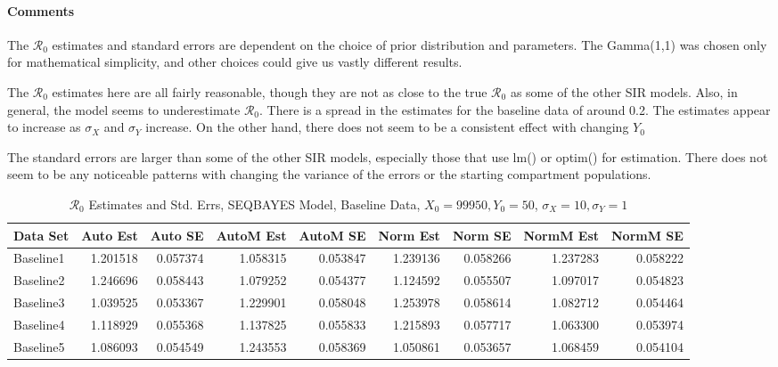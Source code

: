 \documentclass[12pt]{article}
\newcommand{\rr}{\ensuremath{\mathcal{R}_0}}
\begin{document}
\paragraph{Comments}

The $\rr$ estimates and standard errors are dependent on the choice of prior distribution and parameters. The Gamma(1,1) was chosen only for mathematical simplicity, and other choices could give us vastly different results. 

The $\rr$ estimates here are all fairly reasonable, though they are not as close to the true $\rr$ as some of the other SIR models. Also, in general, the model seems to underestimate $\rr$. There is a spread in the estimates for the baseline data of around 0.2. The estimates appear to increase as $\sigma_X$ and $\sigma_Y$ increase. On the other hand, there does not seem to be a consistent effect with changing $Y_0$

The standard errors are larger than some of the other SIR models, especially those that use lm() or optim() for estimation. There does not seem to be any noticeable patterns with changing the variance of the errors or the starting compartment populations.

\begin{table}[H]
	
	\caption{$\rr$ Estimates and Std. Errs, SEQBAYES Model, 
		Baseline Data, $X_0 = 99950, Y_0 = 50$, 
		$\sigma_X = 10, \sigma_Y = 1$}
	\begin{footnotesize}
		\hskip -1cm
		\begin{tabular}{l|r|r|r|r|r|r|r|r}
			\hline
			Data Set & Auto Est & Auto SE & AutoM Est & AutoM SE & Norm Est & Norm SE & NormM Est & NormM SE\\
			\hline
			Baseline1 & 1.201518 & 0.057374 & 1.058315 & 0.053847 & 1.239136 & 0.058266 & 1.237283 & 0.058222\\
			\hline
			Baseline2 & 1.246696 & 0.058443 & 1.079252 & 0.054377 & 1.124592 & 0.055507 & 1.097017 & 0.054823\\
			\hline
			Baseline3 & 1.039525 & 0.053367 & 1.229901 & 0.058048 & 1.253978 & 0.058614 & 1.082712 & 0.054464\\
			\hline
			Baseline4 & 1.118929 & 0.055368 & 1.137825 & 0.055833 & 1.215893 & 0.057717 & 1.063300 & 0.053974\\
			\hline
			Baseline5 & 1.086093 & 0.054549 & 1.243553 & 0.058369 & 1.050861 & 0.053657 & 1.068459 & 0.054104\\
			\hline
		\end{tabular}
	\end{footnotesize}
\end{table}
\end{document}
